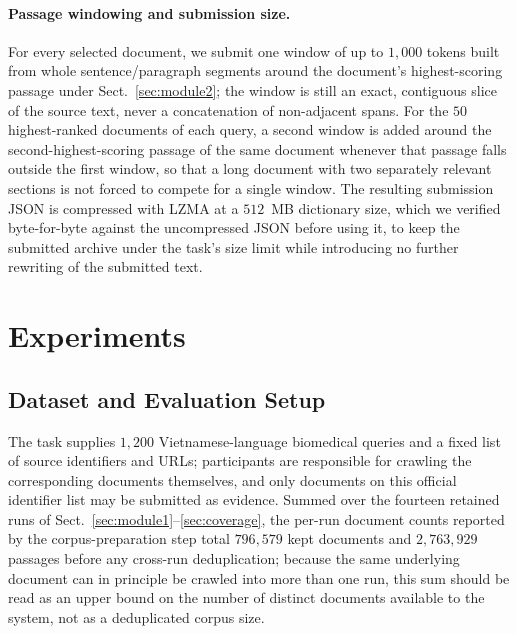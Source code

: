 \documentclass[runningheads]{llncs}
\begin{document}
\paragraph{Passage windowing and submission size.}
For every selected document, we submit one window of up to $1{,}000$ tokens
built from whole sentence/paragraph segments around the document's
highest-scoring passage under Sect.~\ref{sec:module2}; the window is still an
exact, contiguous slice of the source text, never a concatenation of
non-adjacent spans. For the $50$ highest-ranked documents of each query, a
second window is added around the second-highest-scoring passage of the same
document whenever that passage falls outside the first window, so that a
long document with two separately relevant sections is not forced to
compete for a single window. The resulting submission JSON is compressed
with LZMA at a $512$~MB dictionary size, which we verified byte-for-byte
against the uncompressed JSON before using it, to keep the submitted archive
under the task's size limit while introducing no further rewriting of the
submitted text.

\section{Experiments}

\subsection{Dataset and Evaluation Setup}
\label{sec:dataset}

The task supplies $1{,}200$ Vietnamese-language biomedical queries and a
fixed list of source identifiers and URLs; participants are responsible for
crawling the corresponding documents themselves, and only documents on this
official identifier list may be submitted as evidence. Summed over the
fourteen retained runs of Sect.~\ref{sec:module1}--\ref{sec:coverage}, the
per-run document counts reported by the corpus-preparation step total
$796{,}579$ kept documents and $2{,}763{,}929$ passages before any
cross-run deduplication; because the same underlying document can in
principle be crawled into more than one run, this sum should be read as an
upper bound on the number of distinct documents available to the system,
not as a deduplicated corpus size.
\end{document}
